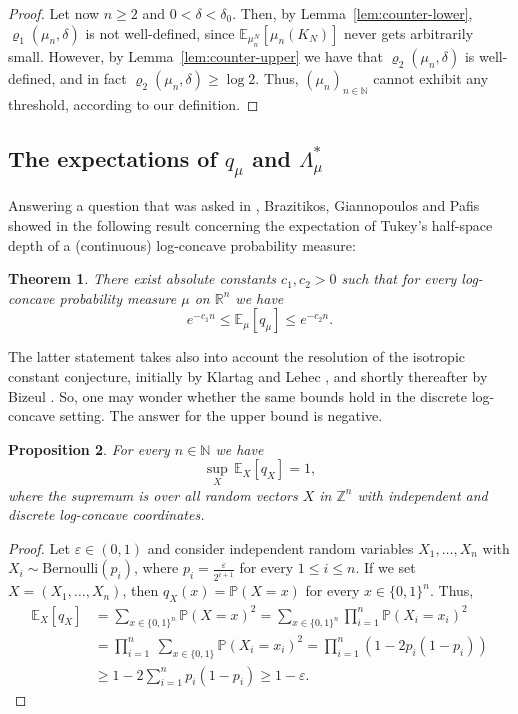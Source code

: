 \documentclass[11pt,a4paper]{article} %
\newtheorem{theorem}{Theorem}[section]
\newtheorem{proposition}[theorem]{Proposition}
\theoremstyle{definition}
\theoremstyle{remark}
\newcommand{\1}{\mathds{1}}
\begin{document}
\begin{proof}
   

    Let now $n \geq 2$ and $0<\delta<\delta_0$. Then, by Lemma~\ref{lem:counter-lower},  $\varrho_1(\mu_n,\delta)$ is not well-defined, since $\mathbb{E}_{\mu_n^N}[\mu_n(K_N)]$ never gets arbitrarily small. However, by Lemma~\ref{lem:counter-upper} we have that $\varrho_2(\mu_n,\delta)$ is well-defined, and in fact $ \varrho_2(\mu_n,\delta)\geq \log 2$. Thus, $(\mu_n)_{n \in \mathbb{N}}$ cannot exhibit any threshold, according to our definition.    \end{proof}


    


\subsection{The expectations of $q_\mu$ and $\Lambda_{\mu}^\ast$}

Answering a question that was asked in \cite{mathoverflow}, Brazitikos, Giannopoulos and Pafis showed in \cite{BGP2} the following result concerning the expectation of Tukey's half-space depth of a (continuous) log-concave probability measure:

\begin{theorem}\label{thm:Tukey-expectation}
    There exist absolute constants $c_1,c_2>0$ such that for every log-concave probability measure $\mu$ on $\mathbb{R}^n$ we have $$e^{-c_1n} \leq \mathbb{E}_{\mu}[q_\mu] \leq e^{-c_2n}.$$
\end{theorem}

The latter statement takes also into account the resolution of the isotropic constant conjecture, initially by Klartag and Lehec \cite{KlartagLehec}, and shortly thereafter by Bizeul \cite{Biz}. So, one may wonder whether the same bounds hold in the discrete log-concave setting. The answer for the upper bound is negative.


\begin{proposition}
For every $n \in \mathbb{N}$ we have $$\sup_X \, \mathbb{E}_X[q_X]=1,$$ where the supremum is over all random vectors $X$ in $\mathbb{Z}^n$ with independent and discrete log-concave coordinates.
\end{proposition}

\begin{proof}
    Let $\varepsilon \in (0,1)$ and consider independent random variables $X_1,\ldots,X_n$  with $X_i \sim \text{Bernoulli}(p_i)$, where $p_i=\frac{\varepsilon}{2^{i+1}}$ for every $1 \leq i \leq n$. If we set $X=(X_1,\ldots,X_n)$, then $q_X(x)=\mathbb{P}(X=x)$ for every $x \in \{0,1\}^n$. Thus, \begin{align*} \mathbb{E}_X[q_X] &=\sum\limits_{x \in \{0,1\}^n} \mathbb{P}(X=x)^2=\sum\limits_{x \in\{0,1\}^n} \prod\limits_{i=1}^{n} \mathbb{P}(X_i=x_i)^2
    \\ &=\prod\limits_{i=1}^{n}\ \sum\limits_{x \in \{0,1\}} \mathbb{P}(X_i=x_i)^2 = \prod\limits_{i=1}^n (1-2p_i(1-p_i)) 
    \\ &\geq 1-2\sum\limits_{i=1}^n p_i(1-p_i) \geq 1-\varepsilon.
    \end{align*}
\end{proof}
\end{document}
